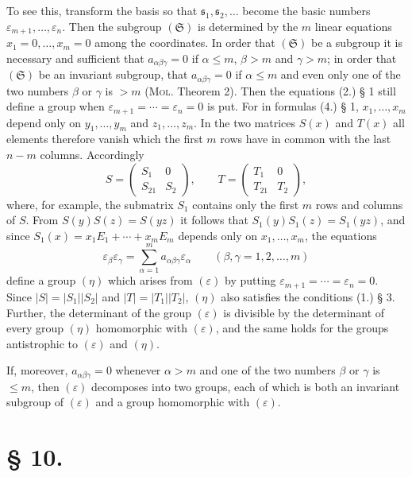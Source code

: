 \documentclass[11pt]{article}
\newcommand{\eps}{\varepsilon}
\begin{document}
To see this, transform the basis so that $\mathfrak s_1,\mathfrak s_2,\ldots$ become the basic numbers $\eps_{m+1},\ldots,\eps_n$. Then the subgroup $(\mathfrak S)$ is determined by the $m$ linear equations $x_1=0,\ldots,x_m=0$ among the coordinates. In order that $(\mathfrak S)$ be a subgroup it is necessary and sufficient that $a_{\alpha\beta\gamma}=0$ if $\alpha\leq m$, $\beta>m$ and $\gamma>m$; in order that $(\mathfrak S)$ be an invariant subgroup, that $a_{\alpha\beta\gamma}=0$ if $\alpha\leq m$ and even only one of the two numbers $\beta$ or $\gamma$ is $>m$ (\textsc{Mol}. Theorem 2). Then the equations (2.) § 1 still define a group when $\eps_{m+1}=\cdots=\eps_n=0$ is put. For in formulas (4.) § 1, $x_1,\ldots,x_m$ depend only on $y_1,\ldots,y_m$ and $z_1,\ldots,z_m$. In the two matrices $S(x)$ and $T(x)$ all elements therefore vanish which the first $m$ rows have in common with the last $n-m$ columns. Accordingly
\[
 S=\begin{pmatrix}S_1&0\\ S_{21}&S_2\end{pmatrix},
 \qquad
 T=\begin{pmatrix}T_1&0\\ T_{21}&T_2\end{pmatrix},
\]
where, for example, the submatrix $S_1$ contains only the first $m$ rows and columns of $S$. From $S(y)S(z)=S(yz)$ it follows that $S_1(y)S_1(z)=S_1(yz)$, and since $S_1(x)=x_1E_1+\cdots+x_mE_m$ depends only on $x_1,\ldots,x_m$, the equations
\[
 \eps_\beta\eps_\gamma=\sum_{\alpha=1}^{m}a_{\alpha\beta\gamma}\eps_\alpha\qquad(\beta,\gamma=1,2,\ldots,m)
\]
define a group $(\eta)$ which arises from $(\eps)$ by putting $\eps_{m+1}=\cdots=\eps_n=0$. Since $|S|=|S_1||S_2|$ and $|T|=|T_1||T_2|$, $(\eta)$ also satisfies the conditions (1.) § 3. Further, the determinant of the group $(\eps)$ is divisible by the determinant of every group $(\eta)$ homomorphic with $(\eps)$, and the same holds for the groups antistrophic to $(\eps)$ and $(\eta)$.

If, moreover, $a_{\alpha\beta\gamma}=0$ whenever $\alpha>m$ and one of the two numbers $\beta$ or $\gamma$ is $\leq m$, then $(\eps)$ decomposes into two groups, each of which is both an invariant subgroup of $(\eps)$ and a group homomorphic with $(\eps)$.

\section*{§ 10.}
\end{document}
